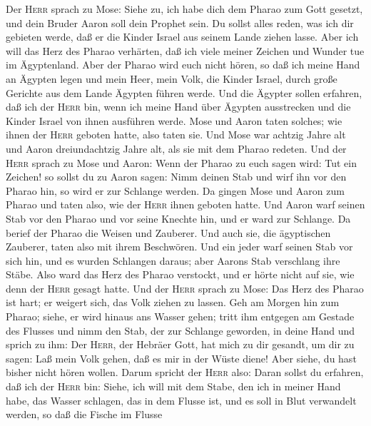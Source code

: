  Der \textsc{Herr} sprach zu Mose: Siehe zu, ich habe dich
dem Pharao zum Gott gesetzt, und dein Bruder Aaron soll dein Prophet
sein.  Du sollst alles reden, was ich dir gebieten werde,
daß er die Kinder Israel aus seinem Lande ziehen lasse. 
Aber ich will das Herz des Pharao verhärten, daß ich viele meiner
Zeichen und Wunder tue im Ägyptenland.  Aber der Pharao
wird euch nicht hören, so daß ich meine Hand an Ägypten legen und mein
Heer, mein Volk, die Kinder Israel, durch große Gerichte aus dem Lande
Ägypten führen werde.  Und die Ägypter sollen erfahren,
daß ich der \textsc{Herr} bin, wenn ich meine Hand über Ägypten
ausstrecken und die Kinder Israel von ihnen ausführen werde.
 Mose und Aaron taten solches; wie ihnen der \textsc{Herr}
geboten hatte, also taten sie.  Und Mose war achtzig Jahre
alt und Aaron dreiundachtzig Jahre alt, als sie mit dem Pharao redeten.
 Und der \textsc{Herr} sprach zu Mose und Aaron:
 Wenn der Pharao zu euch sagen wird: Tut ein Zeichen! so
sollst du zu Aaron sagen: Nimm deinen Stab und wirf ihn vor den Pharao
hin, so wird er zur Schlange werden.  Da gingen Mose und
Aaron zum Pharao und taten also, wie der \textsc{Herr} ihnen geboten
hatte. Und Aaron warf seinen Stab vor den Pharao und vor seine Knechte
hin, und er ward zur Schlange.  Da berief der Pharao die
Weisen und Zauberer. Und auch sie, die ägyptischen Zauberer, taten also
mit ihrem Beschwören.  Und ein jeder warf seinen Stab vor
sich hin, und es wurden Schlangen daraus; aber Aarons Stab verschlang
ihre Stäbe.  Also ward das Herz des Pharao verstockt, und
er hörte nicht auf sie, wie denn der \textsc{Herr} gesagt hatte.
 Und der \textsc{Herr} sprach zu Mose: Das Herz des
Pharao ist hart; er weigert sich, das Volk ziehen zu lassen.
 Geh am Morgen hin zum Pharao; siehe, er wird hinaus ans
Wasser gehen; tritt ihm entgegen am Gestade des Flusses und nimm den
Stab, der zur Schlange geworden, in deine Hand  und
sprich zu ihm: Der \textsc{Herr}, der Hebräer Gott, hat mich zu dir
gesandt, um dir zu sagen: Laß mein Volk gehen, daß es mir in der Wüste
diene! Aber siehe, du hast bisher nicht hören wollen. 
Darum spricht der \textsc{Herr} also: Daran sollst du erfahren, daß ich
der \textsc{Herr} bin: Siehe, ich will mit dem Stabe, den ich in meiner
Hand habe, das Wasser schlagen, das in dem Flusse ist, und es soll in
Blut verwandelt werden,  so daß die Fische im Flusse
